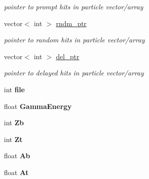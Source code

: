 \begin{DoxyCompactItemize}
\begin{DoxyCompactList}\small\item\em pointer to prompt hits in particle vector/array \end{DoxyCompactList}\item 
\hypertarget{classg__clx_a5dee420c080c876ed2c5467ec212d3f7}{vector$<$ int $>$ \hyperlink{classg__clx_a5dee420c080c876ed2c5467ec212d3f7}{rndm\-\_\-ptr}}\label{classg__clx_a5dee420c080c876ed2c5467ec212d3f7}

\begin{DoxyCompactList}\small\item\em pointer to random hits in particle vector/array \end{DoxyCompactList}\item 
\hypertarget{classg__clx_a8514273470549549d94417e7cade9b82}{vector$<$ int $>$ \hyperlink{classg__clx_a8514273470549549d94417e7cade9b82}{del\-\_\-ptr}}\label{classg__clx_a8514273470549549d94417e7cade9b82}

\begin{DoxyCompactList}\small\item\em pointer to delayed hits in particle vector/array \end{DoxyCompactList}\item 
\hypertarget{classg__clx_a4b7f5bc375e032d31bebb6ba34cb328f}{int {\bfseries file}}\label{classg__clx_a4b7f5bc375e032d31bebb6ba34cb328f}

\item 
\hypertarget{classg__clx_aade220d336f2c91d09b4da5a14138436}{float {\bfseries Gamma\-Energy}}\label{classg__clx_aade220d336f2c91d09b4da5a14138436}

\item 
\hypertarget{classg__clx_a10f3a51541a437abeafdde5e4d919296}{int {\bfseries Zb}}\label{classg__clx_a10f3a51541a437abeafdde5e4d919296}

\item 
\hypertarget{classg__clx_af3a63ef9a4e0e92e6646ec8c9e86cd2d}{int {\bfseries Zt}}\label{classg__clx_af3a63ef9a4e0e92e6646ec8c9e86cd2d}

\item 
\hypertarget{classg__clx_a9806f6d9aa4ecd6daeccd1f8184bbb5e}{float {\bfseries Ab}}\label{classg__clx_a9806f6d9aa4ecd6daeccd1f8184bbb5e}

\item 
\hypertarget{classg__clx_a0a85cb0adca7a54ed29ebda550b36dcc}{float {\bfseries At}}\label{classg__clx_a0a85cb0adca7a54ed29ebda550b36dcc}


\end{DoxyCompactItemize}
